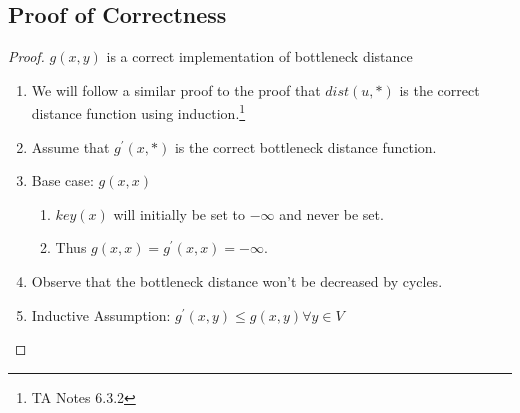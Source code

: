\documentclass{article}
\begin{document}
\subsection{Proof of Correctness}
\begin{proof} \(g(x,y)\) is a correct implementation of bottleneck distance
      \begin{enumerate}
            \item We will follow a similar proof to the proof that \(dist(u, *)\) is the
                  correct distance function using induction.\footnote{TA Notes 6.3.2}
            \item Assume that \(g^\prime (x,*)\) is the correct bottleneck distance function.
            \item Base case: \(g(x,x)\) \begin{enumerate}
                        \item \(key(x)\) will initially be set to \(-\infty \) and never be set.
                        \item Thus \(g(x,x) = g^{\prime}(x,x) = -\infty \).
                  \end{enumerate}
            \item Observe that the bottleneck distance won't be decreased by cycles.
            \item Inductive Assumption: \(g^{\prime}(x,y) \leq g(x,y) \forall y \in V\)
                  \begin{enumerate}


\end{enumerate}
\end{enumerate}
\end{proof}
\end{document}
